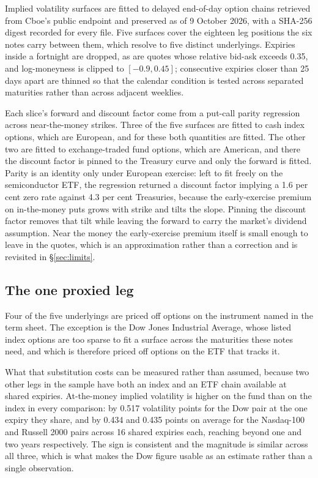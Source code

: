 Implied volatility surfaces are fitted to delayed end-of-day option chains
retrieved from Cboe's public endpoint and preserved as of 9 October 2026, with a
SHA-256 digest recorded for every file. Five surfaces cover the eighteen leg positions the six
notes carry between them, which resolve to five distinct underlyings. Expiries inside a fortnight are dropped, as are quotes whose
relative bid-ask exceeds 0.35, and log-moneyness is clipped to $[-0.9, 0.45]$;
consecutive expiries closer than 25 days apart are thinned so that the calendar
condition is tested across separated maturities rather than across
adjacent weeklies.

Each slice's forward and discount factor come from a put-call parity regression
across near-the-money strikes. Three of the five surfaces are fitted to cash
index options, which are European, and for these both quantities are fitted.
The other two are fitted to exchange-traded fund options, which are American,
and there the discount factor is pinned to the Treasury curve and only the
forward is fitted. Parity is an identity only under European exercise: left to
fit freely on the semiconductor ETF, the regression returned a discount factor
implying a 1.6 per cent zero rate against 4.3 per cent Treasuries, because the
early-exercise premium on in-the-money puts grows with strike and tilts the
slope. Pinning the discount factor removes that tilt while leaving the forward
to carry the market's dividend assumption. Near the money the early-exercise
premium itself is small enough to leave in the quotes, which is an
approximation rather than a correction and is revisited in \S\ref{sec:limits}.

\subsection{The one proxied leg}

Four of the five underlyings are priced off options on the instrument named in
the term sheet. The exception is the Dow Jones Industrial Average, whose listed
index options are too sparse to fit a surface across the maturities these notes
need, and which is therefore priced off options on the ETF that tracks it.

What that substitution costs can be measured rather than assumed, because two
other legs in the sample have both an index and an ETF chain available at shared
expiries. At-the-money implied volatility is higher on the fund than on the
index in every comparison: by 0.517 volatility points for the Dow pair at the
one expiry they share, and by 0.434 and 0.435 points on average for the
Nasdaq-100 and Russell 2000 pairs across 16 shared expiries each, reaching
beyond one and two years respectively. The sign is consistent and the magnitude
is similar across all three, which is what makes the Dow figure usable as an
estimate rather than a single observation.

